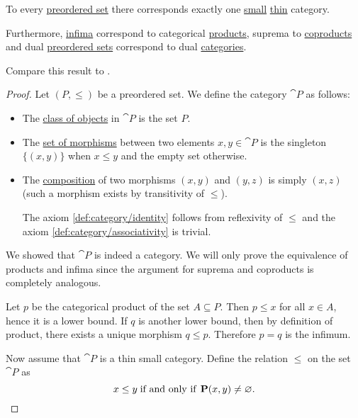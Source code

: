 \begin{proposition}\label{thm:preorder_category_correspondence}
  To every \hyperref[def:preordered_set]{preordered set} there corresponds exactly one \hyperref[def:category_cardinality]{small} \hyperref[def:thin_category]{thin} category.

  Furthermore, \hyperref[def:preordered_set/supremum_and_infimum]{infima} correspond to categorical \hyperref[def:categorical_product]{products}, suprema to \hyperref[def:categorical_coproduct]{coproducts} and dual \hyperref[def:preordered_set/dual]{preordered sets} correspond to dual \hyperref[def:opposite_category]{categories}.

  Compare this result to .
\end{proposition}
\begin{proof}
  \SufficiencySubProof Let \( (P, \leq) \) be a preordered set. We define the category \( \cat{P} \) as follows:
  \begin{itemize}
    \item The \hyperref[def:category/C1]{class of objects} in \( \cat{P} \) is the set \( P \).
    \item The \hyperref[def:category/C2]{set of morphisms} between two elements \( x, y \in \cat{P} \) is the singleton \( \{ (x, y) \} \) when \( x \leq y \) and the empty set otherwise.
    \item The \hyperref[def:category/C3]{composition} of two morphisms \( (x, y) \) and \( (y, z) \) is simply \( (x, z) \) (such a morphism exists by transitivity of \( \leq \)).

    The axiom \ref{def:category/identity} follows from reflexivity of \( \leq \) and the axiom \ref{def:category/associativity} is trivial.
  \end{itemize}

  We showed that \( \cat{P} \) is indeed a category. We will only prove the equivalence of products and infima since the argument for suprema and coproducts is completely analogous.

  Let \( p \) be the categorical product of the set \( A \subseteq P \). Then \( p \leq x \) for all \( x \in A \), hence it is a lower bound. If \( q \) is another lower bound, then by definition of product, there exists a unique morphism \( q \leq p \). Therefore \( p = q \) is the infimum.

  \NecessitySubProof Now assume that \( \cat{P} \) is a thin small category. Define the relation \( \leq \) on the set \( \cat{P} \) as
  \begin{equation*}
    x \leq y \thickspace \text{if and only if} \thickspace \operatorname{\mathbf{P}}(x, y) \neq \varnothing.
  \end{equation*}


\end{proof}
